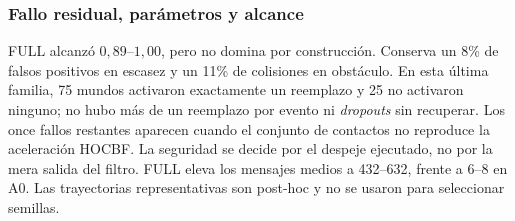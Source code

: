 \subsubsection{Fallo residual, parámetros y alcance}

FULL alcanzó $0{,}89$--$1{,}00$, pero no domina por construcción. Conserva un 8\% de
falsos positivos en escasez y un 11\% de colisiones en obstáculo. En esta última familia,
75 mundos activaron exactamente un reemplazo y 25 no activaron ninguno; no hubo más de
un reemplazo por evento ni \emph{dropouts} sin recuperar. Los once fallos restantes
aparecen cuando el conjunto de contactos no reproduce la aceleración HOCBF. La seguridad
se decide por el despeje ejecutado, no por la mera salida del filtro. FULL eleva los
mensajes medios a 432--632, frente a 6--8 en A0. Las trayectorias representativas son
post-hoc y no se usaron para seleccionar semillas.


